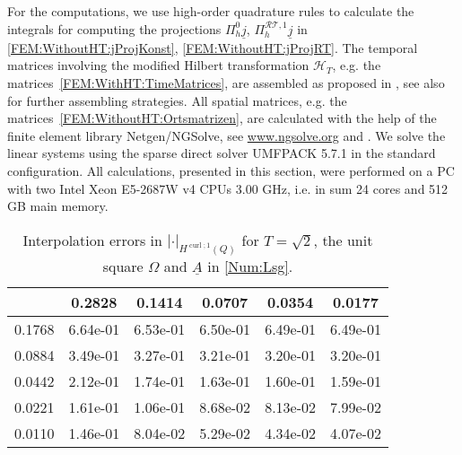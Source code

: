 \documentclass[a4paper,11pt]{article}
\newcommand{\cu}{\operatorname{curl}}
\renewcommand{\vec}[1]{\underline{#1}}
\newcommand{\abs}[1]{\left\lvert{#1}\right\rvert}
\begin{document}
For the computations, we use high-order quadrature rules to calculate the integrals for computing the projections $\Pi_h^0 \vec j$, $\Pi_h^{\mathcal{RT},1} \vec j$ in \eqref{FEM:WithoutHT:jProjKonst}, \eqref{FEM:WithoutHT:jProjRT}. The temporal matrices involving the modified Hilbert transformation $\mathcal H_T$, e.g. the matrices~\eqref{FEM:WithHT:TimeMatrices}, are assembled as proposed in \cite[Subsection~2.2]{ZankCMAM2021}, see also \cite{ZankInt2022} for further assembling strategies. All spatial matrices, e.g. the matrices~\eqref{FEM:WithoutHT:Ortsmatrizen}, are calculated with the help of the finite element library Netgen/NGSolve, see \url{www.ngsolve.org} and \cite{SchoeberlNetgen}. We solve the linear systems using the sparse direct solver  UMFPACK 5.7.1 \cite{Umfpack} in the standard configuration. All calculations, presented in this section, were performed on a PC with two Intel Xeon E5-2687W v4 CPUs 3.00 GHz, i.e. in sum 24 cores and 512 GB main memory.

\begin{table}[h!t]
	\begin{center}
		\begin{footnotesize}\begin{tabular}{r||c|c|c|c|c}
				\diagbox{$h_x$}{\vspace*{-.1cm}$h_t$} & 0.2828 & 0.1414 & 0.0707 & 0.0354 & 0.0177   \\
				\hline\hline
				0.1768 & 6.64e-01 & 6.53e-01 & 6.50e-01 & 6.49e-01 & 6.49e-01 \\
				0.0884 & 3.49e-01 & 3.27e-01 & 3.21e-01 & 3.20e-01 & 3.20e-01 \\
				0.0442 & 2.12e-01 & 1.74e-01 & 1.63e-01 & 1.60e-01 & 1.59e-01 \\
				0.0221 & 1.61e-01 & 1.06e-01 & 8.68e-02 & 8.13e-02 & 7.99e-02 \\
				0.0110 & 1.46e-01 & 8.04e-02 & 5.29e-02 & 4.34e-02 & 4.07e-02
		\end{tabular}\end{footnotesize}
		\caption{Interpolation errors in $\abs{\cdot}_{H^{\cu;1}(Q)}$ for $T=\sqrt{2}$, the unit square $\Omega$ and $\vec A$ in \eqref{Num:Lsg}.} \label{Num:Tab:IntH1Curl}
	\end{center}
\end{table}
\end{document}
